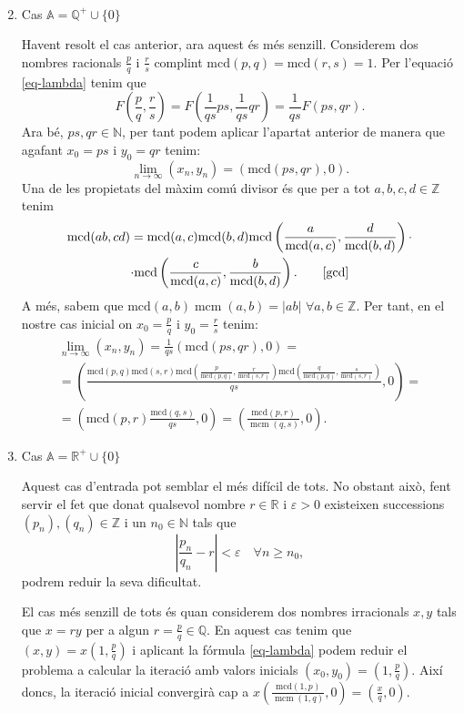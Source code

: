 \documentclass[11pt,a4paper]{article}
\theoremstyle{definition}
\newcommand{\NN}{\ensuremath{\mathbb{N}}}
\newcommand{\ZZ}{\ensuremath{\mathbb{Z}}}
\newcommand{\QQ}{\ensuremath{\mathbb{Q}}}
\newcommand{\RR}{\ensuremath{\mathbb{R}}}
\renewcommand{\gcd}{\text{mcd}}
\DeclareMathOperator{\lcm}{mcm}
\begin{document}
\begin{enumerate}
\begin{multline*}
          \end{multline*}
    \item Cas $\mathbb{A}=\QQ^+\cup\{0\}$\par
          Havent resolt el cas anterior, ara aquest és més senzill. Considerem dos nombres racionals $\frac{p}{q}$ i $\frac{r}{s}$ complint $\gcd(p,q)=\gcd(r,s)=1$. Per l'equació \eqref{eq-lambda} tenim que \begin{equation*}
              F\left(\frac{p}{q},\frac{r}{s}\right)=F\left(\frac{1}{qs}ps,\frac{1}{qs}qr\right)=\frac{1}{qs}F(ps,qr).
          \end{equation*} Ara bé, $ps,qr\in\NN$, per tant podem aplicar l'apartat anterior de manera que agafant $x_0=ps$ i $y_0=qr$ tenim: $$\lim_{n\to\infty}(x_n,y_n)=(\gcd(ps,qr),0).$$ Una de les propietats del màxim comú divisor és que per a tot $a,b,c,d\in\ZZ$ tenim
          \begin{multline*}
              \gcd(ab,cd)=\gcd(a,c)\gcd(b,d)\gcd\left(\frac{a}{\gcd(a,c)},\frac{d}{\gcd(b,d)}\right)\cdot\\\cdot\gcd\left(\frac{c}{\gcd(a,c)},\frac{b}{\gcd(b,d)}\right).\qquad\text{\cite{gcd}}
          \end{multline*} A més, sabem que $\gcd(a,b)\lcm(a,b)=|ab|$ $\forall a,b\in\ZZ$. Per tant, en el nostre cas inicial on $x_0=\frac{p}{q}$ i $y_0=\frac{r}{s}$ tenim:
          \begin{multline*}
              \lim_{n\to\infty}(x_n,y_n)=\frac{1}{qs}(\gcd(ps,qr),0)=\\=\left(\frac{\gcd(p,q)\gcd(s,r)\gcd\left(\frac{p}{\gcd(p,q)},\frac{r}{\gcd(s,r)}\right)\gcd\left(\frac{q}{\gcd(p,q)},\frac{s}{\gcd(s,r)}\right)}{qs},0\right)=\\=\left(\gcd(p,r)\frac{\gcd(q,s)}{qs},0\right)=\left(\frac{\gcd(p,r)}{\lcm(q,s)},0\right).
          \end{multline*}
    \item Cas $\mathbb{A}=\RR^+\cup\{0\}$\par Aquest cas d'entrada pot semblar el més difícil de tots. No obstant això, fent servir el fet que donat qualsevol nombre $r\in\mathbb{R}$ i $\varepsilon>0$ existeixen successions $(p_n),(q_n)\in\ZZ$ i un $n_0\in\mathbb{N}$ tals que $$\left|\frac{p_n}{q_n}-r\right|<\varepsilon\quad\forall n\geq n_0,$$ podrem reduir la seva dificultat.\par El cas més senzill de tots és quan considerem dos nombres irracionals $x,y$ tals que $x=ry$ per a algun $r=\frac{p}{q}\in\QQ$. En aquest cas tenim que $(x,y)=x\left(1,\frac{p}{q}\right)$ i aplicant la fórmula \eqref{eq-lambda} podem reduir el problema a calcular la iteració amb valors inicials $(x_0,y_0)=\left(1,\frac{p}{q}\right)$. Així doncs, la iteració inicial convergirà cap a $x\left(\frac{\gcd(1,p)}{\lcm(1,q)},0\right)=\left(\frac{x}{q},0\right)$.\par

\end{enumerate}
\end{document}
